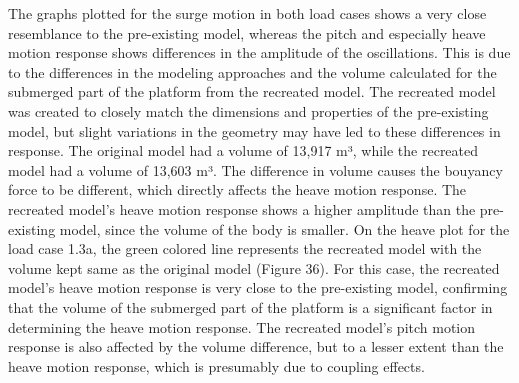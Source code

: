 \documentclass[a4paper, 11pt]{article}
\begin{document}
The graphs plotted for the surge motion in both load cases shows a very close resemblance to the pre-existing model, whereas the pitch and especially heave motion response shows differences in the amplitude of the oscillations. This is due to the differences in the modeling approaches and the volume calculated for the submerged part of the platform from the recreated model. The recreated model was created to closely match the dimensions and properties of the pre-existing model, but slight variations in the geometry may have led to these differences in response. The original model had a volume of 13,917 m³, while the recreated model had a volume of 13,603 m³. The difference in volume causes the bouyancy force to be different, which directly affects the heave motion response. The recreated model's heave motion response shows a higher amplitude than the pre-existing model, since the volume of the body is smaller. On the heave plot for the load case 1.3a, the green colored line represents the recreated model with the volume kept same as the original model (Figure 36). For this case, the recreated model's heave motion response is very close to the pre-existing model, confirming that the volume of the submerged part of the platform is a significant factor in determining the heave motion response. The recreated model's pitch motion response is also affected by the volume difference, but to a lesser extent than the heave motion response, which is presumably due to coupling effects.
\end{document}
